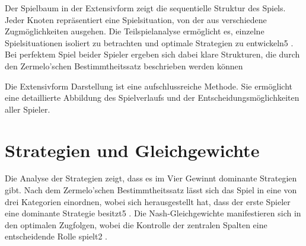 Der Spielbaum in der Extensivform zeigt die sequentielle Struktur des Spiels. Jeder Knoten repräsentiert eine Spielsituation, von der aus verschiedene Zugmöglichkeiten ausgehen. Die Teilspielanalyse ermöglicht es, einzelne Spielsituationen isoliert zu betrachten und optimale Strategien zu entwickeln5
. Bei perfektem Spiel beider Spieler ergeben sich dabei klare Strukturen, die durch den Zermelo'schen Bestimmtheitssatz beschrieben werden können

Die Extensivform Darstellung ist eine aufschlussreiche Methode.
Sie ermöglicht eine detaillierte Abbildung des Spielverlaufs und der Entscheidungsmöglichkeiten aller Spieler.

\section{Strategien und Gleichgewichte}
Die Analyse der Strategien zeigt, dass es im Vier Gewinnt dominante Strategien gibt. Nach dem Zermelo'schen Bestimmtheitssatz lässt sich das Spiel in eine von drei Kategorien einordnen, wobei sich herausgestellt hat, dass der erste Spieler eine dominante Strategie besitzt5
. Die Nash-Gleichgewichte manifestieren sich in den optimalen Zugfolgen, wobei die Kontrolle der zentralen Spalten eine entscheidende Rolle spielt2
.


	